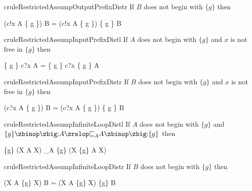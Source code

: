\begin{restatable}{crule}{RestrictedAssumpOutputPrefixDistr}
  \label{restricted-assump-output-prefix-distr-rule}
  If $B$ does not begin with $\{g\}$ then
  \begin{circus}
    (c!x \then A \circseq \{ g \}) \circseq B
    =
    (c!x \then A \circseq \{ g \}) \circseq \{ g \} \circseq B
  \end{circus}
\end{restatable}

\begin{restatable}{crule}{RestrictedAssumpInputPrefixDistl}
  \label{restricted-assump-input-prefix-distl-rule}
  If $A$ does not begin with $\{g\}$ and $x$ is not free in $\{g\}$
  then
  \begin{circus}
    \{ g \} \circseq c?x \then A
    =
    \{ g \} \circseq c?x \then \{ g \} \circseq A
  \end{circus}
\end{restatable}

\begin{restatable}{crule}{RestrictedAssumpInputPrefixDistr}
  \label{restricted-assump-input-prefix-distr-rule}
  If $B$ does not begin with $\{g\}$ and $x$ is not free in $\{g\}$ then
  \begin{circus}
    (c?x \then A \circseq \{ g \}) \circseq B
    =
    (c?x \then A \circseq \{ g \}) \circseq \{ g \} \circseq B
  \end{circus}
\end{restatable}

\begin{restatable}{crule}{RestrictedAssumpInfiniteLoopDistl}
  \label{restricted-assump-infinite-loop-distl-rule}
  If $A$ does not begin with $\{g\}$ and
  $\{g\} \circseq A \circrefines_A A \circseq \{g\} $ then
  \begin{circus}
    \{g\} \circseq (\circmu X \circspot A \circseq X)
    \circrefines_A
    \{g\} \circseq (\circmu X \circspot \{g\} \circseq A \circseq X)
  \end{circus}
\end{restatable}

\begin{restatable}{crule}{RestrictedAssumpInfiniteLoopDistr}
  \label{restricted-assump-infinite-loop-distr-rule}
  If $B$ does not begin with $\{g\}$ then
  \begin{circus}
    (\circmu X \circspot A \circseq \{g\} \circseq X) \circseq B
    =
    (\circmu X \circspot A \circseq \{g\} \circseq X) \circseq \{g\} \circseq B
  \end{circus}
\end{restatable}

